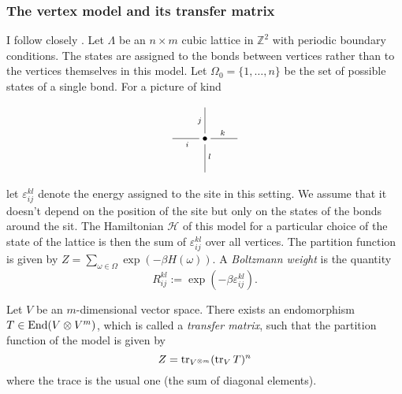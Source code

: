 \subsubsection{The vertex model and its transfer matrix}
I follow closely \cite{chari}. Let $\Lambda$ be an $n \times m$ cubic lattice in $\mathbb Z^2$ with periodic boundary conditions. The states are assigned to the bonds between vertices rather than to the vertices themselves in this model. Let $\Omega_0 = \{1,\ldots,n\}$ be the set of possible states of a single bond. For a picture of kind
\[
\xymatrix{
& &\\
& \bullet \ar@{-}[r]^{k} \ar@{-}[d]^{l} \ar@{-}[u]^{j} \ar@{-}[l]^{i} &\\
& &
}
\]
let $\varepsilon_{ij}^{kl}$ denote the energy assigned to the site in this setting. We assume that it doesn't depend on the position of the site but only on the states of the bonds around the sit. The Hamiltonian $\mathcal H$ of this model for a particular choice of the state of the lattice is then the sum of $\varepsilon_{ij}^{kl}$ over all vertices. The partition function is given by $Z = \sum_{\omega \in \Omega} \exp(-\beta H(\omega))$. A \emph{Boltzmann weight} is the quantity
\[
R_{ij}^{kl} := \exp(-\beta \varepsilon_{ij}^{kl}).
\]
\begin{proposition}
Let $V$ be an $m$-dimensional vector space. There exists an endomorphism $T \in \operatorname{End}(V \otimes V^{m})$, which is called a \emph{transfer matrix}, such that the partition function of the model is given by
\[
Z = \operatorname{tr}_{V^{\otimes m}} (\operatorname{tr}_{V} T)^{n}
\]
where the trace is the usual one (the sum of diagonal elements).
\end{proposition}
